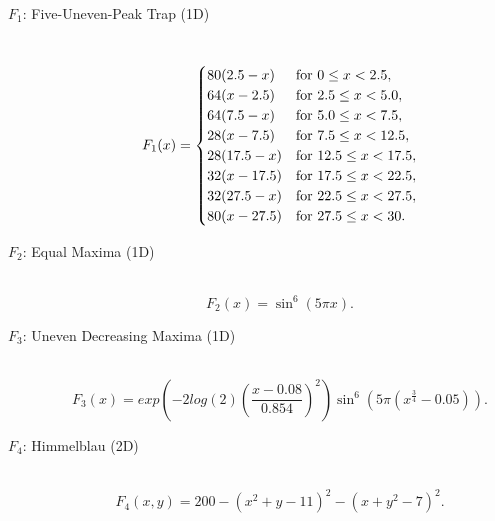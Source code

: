 \documentclass[a4j,11pt]{jarticle}
\begin{document}
\begin{description}
\item[$F_1$: Five-Uneven-Peak Trap (1D)]\mbox{}\\
\begin{equation}
\label{eq:f1}
F_1(x)=\begin{cases}
80(2.5-x) & {\rm for} \ 0 \leq x < 2.5, \\
64(x-2.5) & {\rm for} \ 2.5 \leq x < 5.0, \\
64(7.5-x) & {\rm for} \ 5.0 \leq x < 7.5, \\
28(x-7.5) & {\rm for} \ 7.5 \leq x < 12.5, \\
28(17.5-x) & {\rm for} \ 12.5 \leq x < 17.5, \\
32(x-17.5) & {\rm for} \ 17.5 \leq x < 22.5, \\
32(27.5-x) & {\rm for} \ 22.5 \leq x < 27.5, \\
80(x-27.5) & {\rm for} \ 27.5 \leq x < 30.
\end{cases}
\end{equation}

\item[$F_2$: Equal Maxima (1D)]\mbox{}\\
\begin{equation}
\label{eq:F2}
F_2(x)=\sin^6{(5\pi x)}.
\end{equation}

\item[$F_3$: Uneven Decreasing Maxima (1D)]\mbox{}\\
\begin{equation}
\label{eq:F3}
F_3(x)=exp(-2log(2)(\frac{x-0.08}{0.854})^2)\sin^6{(5\pi(x^{\frac{3}{4}}-0.05))}.
\end{equation}

\item[$F_4$: Himmelblau (2D)]\mbox{}\\
\begin{equation}
\label{eq:F4}
F_4(x,y) = 200 - (x^2+y-11)^2 - (x+y^2-7)^2.
\end{equation}


\end{description}
\end{document}
